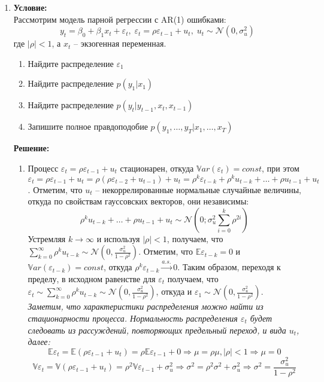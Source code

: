 \documentclass[10pt]{article}
\begin{document}
\begin{enumerate}
\item \textbf{Условие:}\\
Рассмотрим модель парной регрессии с AR(1) ошибками:
$$y_t = \beta_0 + \beta_1x_t + \varepsilon_t, \; \varepsilon_t = \rho\varepsilon_{t-1} + u_t, \; u_t\sim\mathcal{N}(0, \sigma^2_u)$$
где $|\rho| < 1$, а $x_t$ -- экзогенная переменная.
\begin{enumerate}
    \item Найдите распределение $\varepsilon_1$
    \item Найдите распределение $p(y_1|x_1)$
    \item Найдите распределение $p(y_t|y_{t-1}, x_t, x_{t-1})$
    \item Запишите полное правдоподобие $p(y_1, \hdots, y_T|x_1, \hdots, x_T)$
\end{enumerate}

\textbf{Решение:}

\begin{enumerate}
    \item Процесс $\varepsilon_t = \rho\varepsilon_{t-1} + u_t$ стационарен, откуда $\mathbb{V}ar(\varepsilon_t) = const$, при этом
    $\varepsilon_t = \rho\varepsilon_{t-1} + u_t = \rho(\rho\varepsilon_{t-2} + u_{t-1}) + u_t =
    \rho^k\varepsilon_{t-k} + \rho^k u_{t-k} + \hdots + \rho u_{t-1} + u_t$. Отметим, что $u_t$ -- некоррелированные нормальные случайные величины, откуда
    по свойствам гауссовских векторов, они независимы:
    $$\rho^k u_{t-k} + \hdots + \rho u_{t-1} + u_t \sim \mathcal{N}(0; \sigma^2_u\sum\limits_{i=0}^k \rho^{2i})$$
    Устремляя $k\rightarrow\infty$ и используя $|\rho|<1$, получаем, что $\sum\limits_{k=0}^{\infty}\rho^k u_{t-k} \sim\mathcal{N}(0, \frac{\sigma_u^2}{1 - \rho^2})$.
    Отметим, что $\mathbb{E}\varepsilon_{t-k} = 0$ и $\mathbb{V}ar(\varepsilon_{t-k})=const$, откуда $\rho^k\varepsilon_{t-k}\xrightarrow{a.s.} 0$. Таким образом,
    переходя к пределу, в исходном равенстве для $\varepsilon_{t}$ получаем, что $\varepsilon_{t}\sim\sum\limits_{k=0}^{\infty}\rho^k u_{t-k}
    \sim\mathcal{N}(0, \frac{\sigma_u^2}{1 - \rho^2})$, откуда и $\varepsilon_1\sim\mathcal{N}(0, \frac{\sigma_u^2}{1 - \rho^2})$.\\
    \textit{Заметим, что характеристики распределения можно найти из стационарности процесса.
    Нормальность распределения $\varepsilon_t$ будет следовать из рассуждений, повторяющих предельный переход, и вида $u_t$, далее:
    $$\mathbb{E}\varepsilon_t = \mathbb{E}(\rho\varepsilon_{t-1} + u_t) = \rho\mathbb{E}\varepsilon_{t-1} + 0 \Rightarrow \mu = \rho\mu, |\rho|<1\Rightarrow \mu=0$$
    $$\mathbb{V}\varepsilon_t = \mathbb{V}(\rho\varepsilon_{t-1} + u_t) = \rho^2\mathbb{V}\varepsilon_{t-1} + \sigma_u^2\Rightarrow \sigma^2 =
    \rho^2\sigma^2 + \sigma_u^2\Rightarrow \sigma^2 = \frac{\sigma_u^2}{1 - \rho^2}$$
    }


\end{enumerate}
\end{enumerate}
\end{document}
